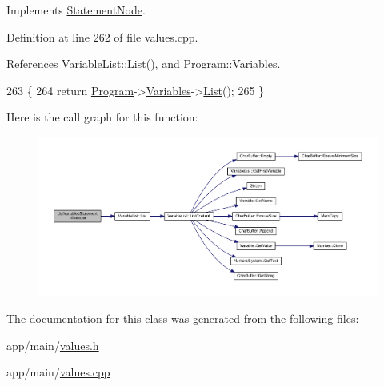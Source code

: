 Implements \hyperlink{classStatementNode_a721589622c930c010927b9a9c55b173e}{Statement\+Node}.



Definition at line 262 of file values.\+cpp.



References Variable\+List\+::\+List(), and Program\+::\+Variables.


\begin{DoxyCode}
263 \{
264     \textcolor{keywordflow}{return} \hyperlink{classProgram}{Program}->\hyperlink{classProgram_a1d4f53befb0270e64c91c24d14061188}{Variables}->\hyperlink{classVariableList_a8ddefb92c0c2f18f096f0fc4363d5af6}{List}();
265 \}
\end{DoxyCode}


Here is the call graph for this function\+:\nopagebreak
\begin{figure}[H]
\begin{center}
\leavevmode
\includegraphics[width=350pt]{classListVariablesStatement_a2ca734439e1c118b8b62d550baac8dc0_cgraph}
\end{center}
\end{figure}




The documentation for this class was generated from the following files\+:\begin{DoxyCompactItemize}
\item 
app/main/\hyperlink{values_8h}{values.\+h}\item 
app/main/\hyperlink{values_8cpp}{values.\+cpp}\end{DoxyCompactItemize}
